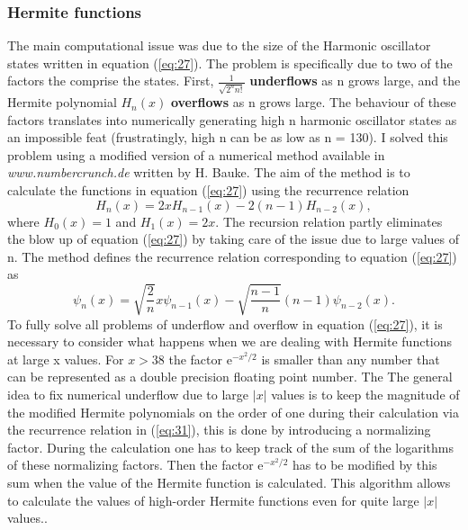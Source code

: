 \documentclass[10pt, a4paper, singlespacing]{report}
\begin{document}
\subsubsection{Hermite functions}\label{Hermite functions}
The main computational issue was due to the size of the Harmonic oscillator states written in equation (\ref{eq:27}). The problem is specifically due to two of the factors the comprise the states. First, $\frac{1}{\sqrt{2^n n!}}$ \textbf{underflows} as n grows large, and the Hermite polynomial $H_n(x)$ \textbf{overflows} as n grows large. The behaviour of these factors translates into numerically generating high n harmonic oscillator states as an impossible feat (frustratingly, high n can be as low as n = 130).
I solved this problem using a modified version of a numerical method available in \emph{www.numbercrunch.de} written by H. Bauke. The aim of the method is to calculate the functions in equation (\ref{eq:27}) using the recurrence relation 
\begin{equation} \label{eq:30}
H_n(x) = 2xH_{n-1}(x) - 2(n-1)H_{n-2}(x),
\end{equation}
where $H_0(x) = 1 $ and $H_1(x) = 2x$. The recursion relation partly eliminates the blow up of equation (\ref{eq:27}) by taking care of the issue due to large values of n. The method defines the recurrence relation corresponding to equation (\ref{eq:27}) as 
\begin{equation} \label{eq:31}
\psi_n(x) = \sqrt{\frac{2}{n}}x\psi_{n-1}(x) - \sqrt{\frac{n-1}{n}}(n-1)\psi_{n-2}(x).
\end{equation}
To fully solve all problems of underflow and overflow in equation (\ref{eq:27}), it is necessary to consider what happens when we are dealing with Hermite functions at large x values.
For $x>38$ the factor $\mathrm{e}^{-x^2/2}$ is smaller than any number that can be represented as a double precision floating point number. The The general idea to fix numerical underflow due to large $|x|$ values is to keep the magnitude of the modified Hermite polynomials on the order of one during their calculation via the recurrence relation in (\ref{eq:31}), this is done by introducing a normalizing factor. During the calculation one has to keep track of the sum of the logarithms of these normalizing factors. Then the factor $\mathrm{e}^{-x^2/2}$ has to be modified by this sum when the value of the Hermite function is calculated. This algorithm allows to calculate the values of high-order Hermite functions even for quite large $|x|$ values.\cite{Bauke}.\\
\end{document}

